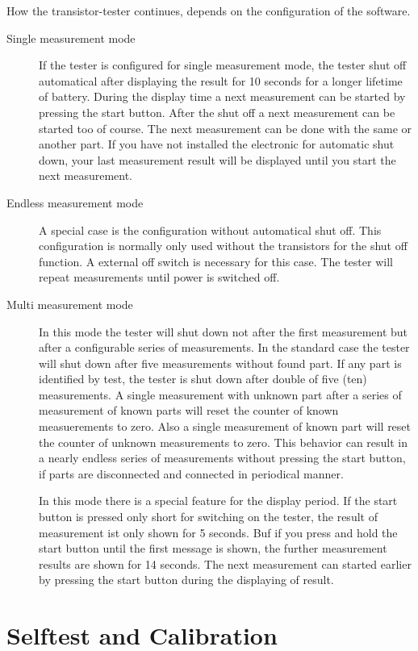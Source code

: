 How the transistor-tester continues, depends on the configuration of the software.
\begin{description}
  \item[Single measurement mode] If the tester is configured for single measurement mode, the tester shut off automatical after displaying the
result for 10 seconds for a longer lifetime of battery. 
During the display time a next measurement can be started by pressing the start button.
After the shut off a next measurement can be started too of course.
The next measurement can be done with the same or another part.
If you have not installed the electronic for automatic shut down, your
last measurement result will be displayed until you start the next measurement.

  \item[Endless measurement mode] A special case is the configuration without automatical shut off.
This configuration is normally only used without the transistors for the shut off function.
A external off switch is necessary for this case. The tester will repeat measurements until power
is switched off.

  \item[Multi measurement mode] In this mode the tester will shut down not after the first measurement but 
after a configurable series of measurements. In the standard case the tester will shut down after five
measurements without found part. If any part is identified by test, the tester is shut down after double of
five (ten) measurements. A single measurement with unknown part after a series of measurement of known parts will
reset the counter of known measuerements to zero. Also a single measurement of known part will reset the counter
of unknown measurements to zero. This behavior can result in a nearly endless series of measurements without
pressing the start button, if parts are disconnected and connected in periodical manner.

In this mode there is a special feature for the display period. If the start button is pressed only short for switching
on the tester, the result of measurement ist only shown for 5 seconds. Buf if you press and hold the start button until
the first message is shown, the further measurement results are shown for 14 seconds.
The next measurement can started earlier by pressing the start button during the displaying of result.

\end{description}

\section{Selftest and Calibration}

